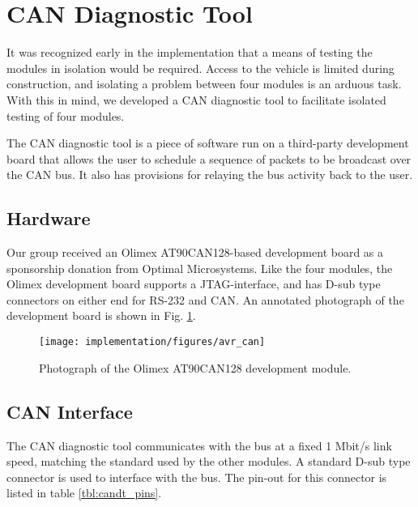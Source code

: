 \section{CAN Diagnostic Tool}
\label{sec:implementation_candt}

It was recognized early in the implementation that a means of testing the modules in isolation would be required. Access to the vehicle is limited during construction, and isolating a problem between four modules is an arduous task. With this in mind, we developed a CAN diagnostic tool to facilitate isolated testing of four modules.

The CAN diagnostic tool is a piece of software run on a third-party development board that allows the user to schedule a sequence of packets to be broadcast over the CAN bus. It also has provisions for relaying the bus activity back to the user.

\subsection{Hardware}

Our group received an Olimex AT90CAN128-based development board as a sponsorship donation from Optimal Microsystems. Like the four modules, the Olimex development board supports a JTAG-interface, and has D-sub type connectors on either end for RS-232 and CAN. An annotated photograph of the development board is shown in Fig. \ref{fig:impl_avr_can}.

\begin{figure}[H]
\centering
\texttt{[image: implementation/figures/avr\_can]}
\caption{Photograph of the Olimex AT90CAN128 development module.}
\label{fig:impl_avr_can}
\end{figure}

\subsection{CAN Interface}

The CAN diagnostic tool communicates with the bus at a fixed 1 Mbit/s link speed, matching the standard used by the other modules. A standard D-sub type connector is used to interface with the bus. The pin-out for this connector is listed in table \ref{tbl:candt_pins}. 

